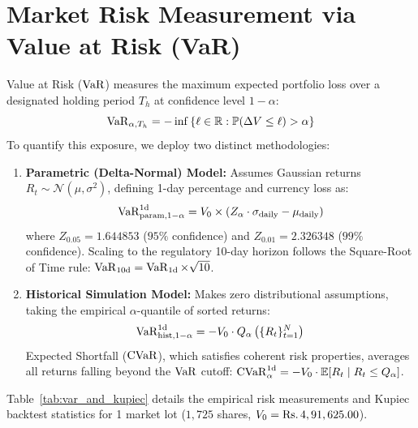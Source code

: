 
\section{Market Risk Measurement via Value at Risk (VaR)}
\label{sec:var_modeling}

Value at Risk ($\operatorname{VaR}$) measures the maximum expected portfolio loss over a designated holding period $T_h$ at confidence level $1 - \alpha$:
\begin{equation}
\operatorname{VaR}_{\alpha, T_h} = -\inf \left\{ \ell \in \mathbb{R} : \mathbb{P}(\Delta V \le \ell) > \alpha \right\}
\end{equation}
To quantify this exposure, we deploy two distinct methodologies:

\begin{enumerate}[leftmargin=1.8em, noitemsep]
    \item \textbf{Parametric (Delta-Normal) Model:} Assumes Gaussian returns $R_t \sim \mathcal{N}(\mu, \sigma^2)$, defining 1-day percentage and currency loss as:
    \begin{equation}
    \operatorname{VaR}_{\text{param}, 1-\alpha}^{1\text{d}} = V_0 \times \left(Z_{\alpha} \cdot \sigma_{\text{daily}} - \mu_{\text{daily}}\right)
    \end{equation}
    where $Z_{0.05} = 1.644853$ ($95\%$ confidence) and $Z_{0.01} = 2.326348$ ($99\%$ confidence). Scaling to the regulatory 10-day horizon follows the Square-Root of Time rule: $\operatorname{VaR}_{10\text{d}} = \operatorname{VaR}_{1\text{d}} \times \sqrt{10}$.
    \item \textbf{Historical Simulation Model:} Makes zero distributional assumptions, taking the empirical $\alpha$-quantile of sorted returns:
    \begin{equation}
    \operatorname{VaR}_{\text{hist}, 1-\alpha}^{1\text{d}} = - V_0 \cdot Q_{\alpha}\left(\{R_t\}_{t=1}^N\right)
    \end{equation}
    Expected Shortfall ($\operatorname{CVaR}$), which satisfies coherent risk properties, averages all returns falling beyond the $\operatorname{VaR}$ cutoff: $\operatorname{CVaR}_{\alpha}^{1\text{d}} = - V_0 \cdot \mathbb{E}[R_t \mid R_t \le Q_{\alpha}]$.
\end{enumerate}

Table~\ref{tab:var_and_kupiec} details the empirical risk measurements and Kupiec backtest statistics for 1 market lot ($1,725$ shares, $V_0 = \text{\text{Rs.}\,}4,91,625.00$).

